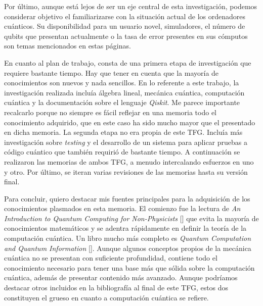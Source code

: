 Por último, aunque está lejos de ser un eje central de esta investigación, podemos considerar objetivo el familiarizarse con la situación actual de los ordenadores cuánticos. Su disponibilidad para un usuario novel, simuladores, el número de qubits que presentan actualmente o la tasa de error presentes en sus cómputos son temas mencionados en estas páginas.

En cuanto al plan de trabajo, consta de una primera etapa de investigación que requiere bastante tiempo. Hay que tener en cuenta que la mayoría de conocimientos son nuevos y nada sencillos. En lo referente a este trabajo, la investigación realizada incluía álgebra lineal, mecánica cuántica, computación cuántica y la documentación sobre el lenguaje \textit{Qiskit}. Me parece importante recalcarlo porque no siempre es fácil reflejar en una memoria todo el conocimiento adquirido, que en este caso ha sido mucho mayor que el presentado en dicha memoria.
%
La segunda etapa no era propia de este TFG. Incluía más investigación sobre \textit{testing} y el desarrollo de un sistema para aplicar pruebas a código cuántico que también requirió de bastante tiempo. A continuación se realizaron las memorias de ambos TFG, a menudo intercalando esfuerzos en uno y otro. Por último, se iteran varias revisiones de las memorias hasta su versión final.

Para concluir, quiero destacar mis fuentes principales para la adquisición de los conocimientos plasmados en esta memoria. El comienzo fue la lectura de \textit{An Introduction to Quantum Computing for Non-Physicists} [\cite{rieffel2000introduction}] que evita la mayoría de conocimientos matemáticos y se adentra rápidamente en definir la teoría de la computación cuántica. Un libro mucho más completo es \textit{Quantum Computation and Quantum Information} [\cite{nielsen2001quantum}]. Aunque algunos conceptos propios de la mecánica cuántica no se presentan con suficiente profundidad, contiene todo el conocimiento necesario para tener una base más que sólida sobre la computación cuántica, además de presentar contenido más avanzado. Aunque podríamos destacar otros incluidos en la bibliografía al final de este TFG, estos dos constituyen el grueso en cuanto a computación cuántica se refiere.